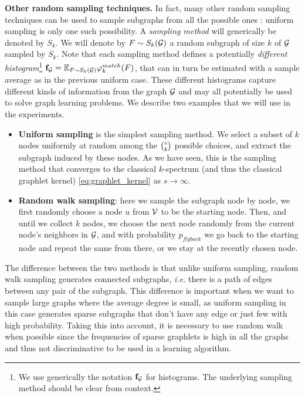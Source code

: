 \noindent\textbf{Other random sampling techniques.} In fact, many other random sampling techniques can be used to sample subgraphs from all the possible ones \citep{graph_sampling}: uniform sampling is only one such possibility. A \emph{sampling method} will generically be denoted by $S_k$. We will denote by $F \sim S_k(\mathcal{G})$ a random subgraph of size $k$ of $\mathcal{G}$ sampled by $S_k$. Note that each sampling method defines a potentially \emph{different histogram}\footnote{We use generically the notation $\mathbf{f}_{\mathcal{G}}$ for histograms. The underlying sampling method should be clear from context.} $\mathbf{f}_{\mathcal{G}} = \mathbb{E}_{F \sim S_k(\mathcal{G})} \varphi^{match}_k(F)$, that can in turn be estimated with a sample average as in the previous uniform case. These different histograms capture different kinds of information from the graph $\mathcal{G}$ and may all potentially be used to solve graph learning problems. We describe two examples that we will use in the experiments.
\begin{itemize}
\item \textbf{Uniform sampling} is the simplest sampling method. We select a subset of $k$ nodes uniformly at random among the $\tbinom{v}{k}$ possible choices, and extract the subgraph induced by these nodes. As we have seen, this is the sampling method that converges to the classical $k$-spectrum (and thus the classical graphlet kernel) \eqref{eq:graphlet_kernel} as $s \to \infty$.
\item \textbf{Random walk sampling}: here we sample the subgraph node by node, we first randomly choose a node $u$ from $\mathcal{V}$ to be the starting node. Then, and until we collect $k$ nodes, we choose the next node randomly from the current node's neighbors in $\mathcal{G}$, and with probability $p_{flyback}$ we go back to the starting node and repeat the same from there, or we stay at the recently chosen node.
\end{itemize}
The difference between the two methods is that unlike uniform sampling, random walk sampling generates  connected subgraphs, \emph{i.e.} there is a path of edges between any pair of the subgraph. This difference is important when we want to sample large graphs where the average degree is small, as uniform sampling in this case generates sparse subgraphs that don't have any edge or just few with high probability. Taking this into account, it is necessary to use random walk when possible since the frequencies of sparse graphlets is high in all the graphs and thus not discriminative to be used in a learning algorithm. 

